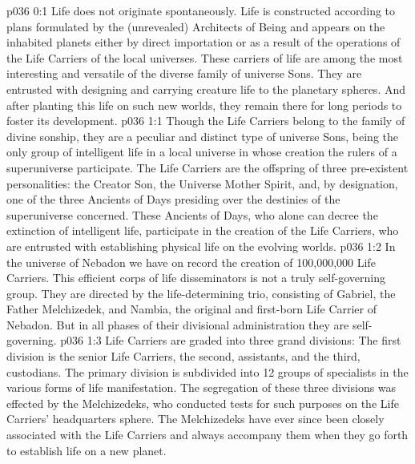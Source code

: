 \author{Vorondadek Son}
\vs p036 0:1 Life does not originate spontaneously. Life is constructed according to plans formulated by the (unrevealed) Architects of Being and appears on the inhabited planets either by direct importation or as a result of the operations of the Life Carriers of the local universes. These carriers of life are among the most interesting and versatile of the diverse family of universe Sons. They are entrusted with designing and carrying creature life to the planetary spheres. And after planting this life on such new worlds, they remain there for long periods to foster its development.
\vs p036 1:1 Though the Life Carriers belong to the family of divine sonship, they are a peculiar and distinct type of universe Sons, being the only group of intelligent life in a local universe in whose creation the rulers of a superuniverse participate. The Life Carriers are the offspring of three pre\hyp{}existent personalities: the Creator Son, the Universe Mother Spirit, and, by designation, one of the three Ancients of Days presiding over the destinies of the superuniverse concerned. These Ancients of Days, who alone can decree the extinction of intelligent life, participate in the creation of the Life Carriers, who are entrusted with establishing physical life on the evolving worlds.
\vs p036 1:2 In the universe of Nebadon we have on record the creation of 100,000,000 Life Carriers. This efficient corps of life disseminators is not a truly self\hyp{}governing group. They are directed by the life\hyp{}determining trio, consisting of Gabriel, the Father Melchizedek, and Nambia, the original and first\hyp{}born Life Carrier of Nebadon. But in all phases of their divisional administration they are self\hyp{}governing.
\vs p036 1:3 Life Carriers are graded into three grand divisions: The first division is the senior Life Carriers, the second, assistants, and the third, custodians. The primary division is subdivided into 12 groups of specialists in the various forms of life manifestation. The segregation of these three divisions was effected by the Melchizedeks, who conducted tests for such purposes on the Life Carriers’ headquarters sphere. The Melchizedeks have ever since been closely associated with the Life Carriers and always accompany them when they go forth to establish life on a new planet.
